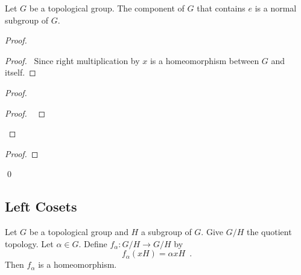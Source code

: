 \begin{prop}
Let $G$ be a topological group. The component of $G$ that contains $e$ is a normal subgroup of $G$.
\end{prop}

\begin{proof}
\pf
{}
\begin{proof}
	\pf\ Since right multiplication by $x$ is a homeomorphism between $G$ and itself.
\end{proof}
\begin{proof}
	\begin{proof}
		\pf\ 
	\end{proof}
\end{proof}
\begin{proof}
\end{proof}
\qed
\end{proof}

\subsection{Left Cosets}

\begin{prop}
Let $G$ be a topological group and $H$ a subgroup of $G$. Give $G/H$ the quotient topology. Let $\alpha \in G$. Define $f_\alpha : G/H \rightarrow G/H$ by
\[ f_\alpha(xH) = \alpha x H \enspace . \]
Then $f_\alpha$ is a homeomorphism.
\end{prop}

